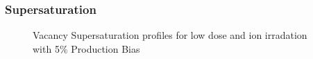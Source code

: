 \documentclass[a4paper]{article}
\begin{document}
    \newpage
    \subsubsection{Supersaturation}
      \begin{figure}[h!]  %
        \centering
        \qquad
        \caption{Vacancy Supersaturation profiles for low dose and ion irradation with 5\% Production Bias}
        \label{figure:vacancy_supersaturation_ion_5}
      \end{figure}
\end{document}
